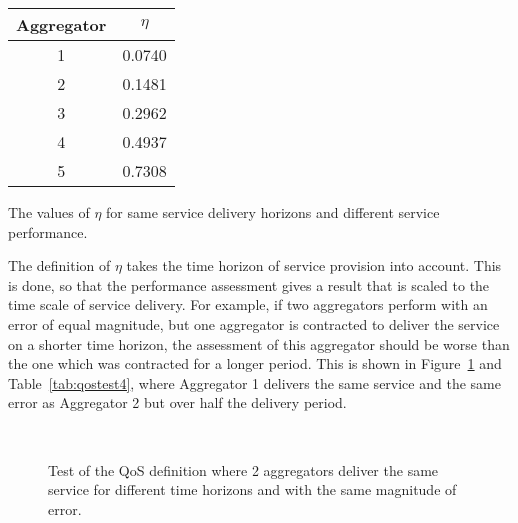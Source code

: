 \begin{margintable}[-45\baselineskip]%
	\centering
	\begin{tabular}{cc}
		\toprule
		Aggregator & $\eta$ \\
		\midrule
		1 & 0.0740 \\
		2 & 0.1481 \\
		3 & 0.2962 \\
		4 & 0.4937 \\
		5 & 0.7308 \\
		\bottomrule
	\end{tabular}
	\caption{The values of $\eta$ for same service delivery horizons and different service performance.}
	\label{tab:qostest3}
\end{margintable}
The definition of $\eta$ takes the time horizon of service provision into account. This is done, so that the performance assessment gives a result that is scaled to the time scale of service delivery. For example, if two aggregators perform with an error of equal magnitude, but one aggregator is contracted to deliver the service on a shorter time horizon, the assessment of this aggregator should be worse than the one which was contracted for a longer period. This is shown in Figure~\ref{fig:indextest4} and Table~\ref{tab:qostest4}, where Aggregator 1 delivers the same service and the same error as Aggregator 2 but over half the delivery period.

\begin{figure}[htb!]
\centering
{}\\
\caption{Test of the QoS definition where 2 aggregators deliver the same service for different time horizons and with the same magnitude of error.}
\label{fig:indextest4}
\end{figure}

